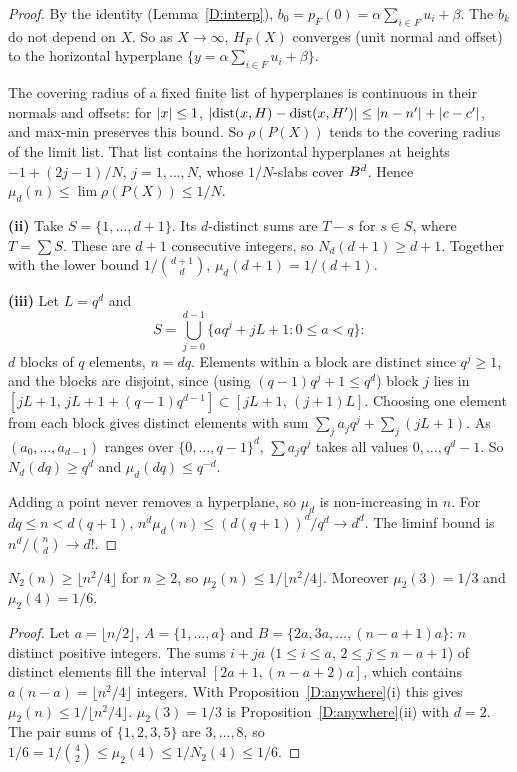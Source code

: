 \begin{proof}
By the identity (Lemma~\ref{D:interp}), $b_0=p_F(0)=\alpha\sum_{i\in F}u_i+\beta$. The $b_k$ do not
depend on $X$. So as $X\to\infty$, $H_F(X)$ converges (unit normal and offset) to the horizontal
hyperplane $\{y=\alpha\sum_{i\in F}u_i+\beta\}$.

The covering radius of a fixed finite list of hyperplanes is continuous in their normals and
offsets: for $\left|x\right|\le1$, $\left|\operatorname{dist}(x,H)-\operatorname{dist}(x,H')\right|\le\left|n-n'\right|+\left|c-c'\right|$, and max-min
preserves this bound. So $\rho(P(X))$ tends to the covering radius of the limit list. That list
contains the horizontal hyperplanes at heights $-1+(2j-1)/N$, $j=1,\dots,N$, whose $1/N$-slabs cover
$B^d$. Hence $\mu_d(n)\le\lim\rho(P(X))\le1/N$.

\textbf{(ii)} Take $S=\{1,\dots,d+1\}$. Its $d$-distinct sums are $T-s$ for $s\in S$, where
$T=\sum S$. These are $d+1$ consecutive integers, so $N_d(d+1)\ge d+1$. Together with the lower
bound $1/\binom{d+1}{d}$, $\mu_d(d+1)=1/(d+1)$.

\textbf{(iii)} Let $L=q^d$ and
\[
  S=\bigcup_{j=0}^{d-1}\{aq^j+jL+1:0\le a<q\}:
\]
$d$ blocks of $q$ elements, $n=dq$. Elements within a block are distinct since $q^j\ge1$, and the
blocks are disjoint, since (using $(q-1)q^j+1\le q^d$) block $j$ lies in
$[jL+1,\,jL+1+(q-1)q^{d-1}]\subset[jL+1,\,(j+1)L]$. Choosing one element from each block gives
distinct elements with sum $\sum_ja_jq^j+\sum_j(jL+1)$. As $(a_0,\dots,a_{d-1})$ ranges over
$\{0,\dots,q-1\}^d$, $\sum a_jq^j$ takes all values $0,\dots,q^d-1$. So $N_d(dq)\ge q^d$ and
$\mu_d(dq)\le q^{-d}$.

Adding a point never removes a hyperplane, so $\mu_d$ is non-increasing in $n$. For
$dq\le n<d(q+1)$, $n^d\mu_d(n)\le(d(q+1))^d/q^d\to d^d$. The liminf bound is
$n^d/\binom{n}{d}\to d!$.
\end{proof}

\begin{lemma}\label{D:N2}
$N_2(n)\ge\lfloor n^2/4\rfloor$ for $n\ge2$, so $\mu_2(n)\le1/\lfloor n^2/4\rfloor$. Moreover $\mu_2(3)=1/3$
and $\mu_2(4)=1/6$.
\end{lemma}

\begin{proof}
Let $a=\lfloor n/2\rfloor$, $A=\{1,\dots,a\}$ and $B=\{2a,3a,\dots,(n-a+1)a\}$: $n$ distinct positive
integers. The sums $i+ja$ ($1\le i\le a$, $2\le j\le n-a+1$) of distinct elements fill the interval
$[2a+1,(n-a+2)a]$, which contains $a(n-a)=\lfloor n^2/4\rfloor$ integers. With
Proposition~\ref{D:anywhere}(i) this gives $\mu_2(n)\le1/\lfloor n^2/4\rfloor$. $\mu_2(3)=1/3$ is
Proposition~\ref{D:anywhere}(ii) with $d=2$. The pair sums of
$\{1,2,3,5\}$ are $3,\dots,8$, so $1/6=1/\binom42\le\mu_2(4)\le1/N_2(4)\le1/6$.
\end{proof}

